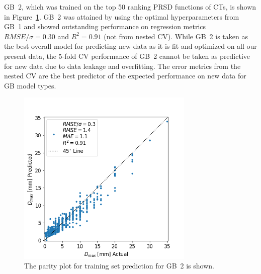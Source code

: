 \documentclass[11pt,a4paper]{article}
\begin{document}
\par
GB~2, which was trained on the top 50 ranking PRSD functions of CTs, is shown in Figure~\ref{parity_model}. GB~2 was attained by using the optimal hyperparameters from GB~1 and showed outstanding performance on regression metrics $RMSE/\sigma=0.30$ and $R^{2}=0.91$ (not from nested CV). While GB~2 is taken as the best overall model for predicting new data as it is fit and optimized on all our present data, the 5-fold CV performance of GB~2 cannot be taken as predictive for new data due to data leakage and overfitting. The error metrics from the nested CV are the best predictor of the expected performance on new data for GB model types.

\begin{figure}[H]
\centering
\includegraphics[width=0.75\textwidth]{figures/parity_model.png}
\caption{The parity plot for training set prediction for GB~2 is shown.}
\label{parity_model}
\end{figure}
\end{document}
